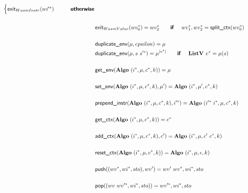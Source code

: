 \begin{align*}
\begin{cases}
      \exit_{WasmInstr}(\seq{wi'}) &\quad\quad \premise{otherwise} \\
    \end{cases}
  \\
%
\newline \\
  &\exit_{WasmValue}(\seq{wv_0}) = \seq{wv_2}
  \quad\quad\premise{if}\quad ~ \seq{wv_1}, \seq{wv_2} = \splitctx(\seq{wv_0}) \\
%
\newline \\
  &\duplicateenv(\mu, epsilon) = \mu \\
  &\duplicateenv(\mu, s ~ \seq{s'}) = \mu^{|\seq v|}
  \quad\quad\premise{if}\quad ~ \listv ~ \seq v = \mu(s) \\
%
\newline \\
  &\getenv(\algo ~ (\seq i, \mu, \seq c, k)) = \mu \\
%
\newline \\
  &\setenv(\algo ~ (\seq i, \mu, \seq c, k), \mu') = \algo ~ (\seq i, \mu', \seq c, k) \\
%
\newline \\
  &\prependinstr(\algo ~ (\seq i, \mu, \seq c, k), \seq{i'}) = \algo ~ (\seq{i'} ~ \seq i, \mu, \seq c, k) \\
%
\newline \\
  &\getctx(\algo ~ (\seq i, \mu, \seq c, k)) = \seq c \\
%
\newline \\
  &\addctx(\algo ~ (\seq i, \mu, \seq c, k), c') = \algo ~ (\seq i, \mu, c' ~ \seq c, k) \\
%
\newline \\
  &\resetctx(\algo ~ (\seq i, \mu, \seq c, k)) = \algo ~ (\seq i, \mu, \epsilon, k) \\
%
\newline \\
  &\push((\seq{wv}, \seq{wi}, sto), wv') = wv' ~ \seq{wv}, \seq{wi}, sto \\
%
\newline \\
  &\pop((wv ~ \seq{wv'}, \seq{wi}, sto)) = \seq{wv'}, \seq{wi}, sto \\

\end{align*}
